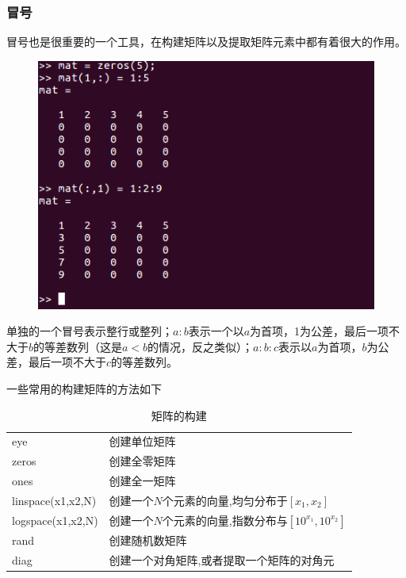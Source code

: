 \documentclass[a4paper,11pt]{ctexart}
\begin{document}
\subsubsection{冒号}
冒号也是很重要的一个工具，在构建矩阵以及提取矩阵元素中都有着很大的作用。
\begin{figure}[H]
	\begin{center}
		\includegraphics[width=.6\textwidth]{maohao.png}
	\end{center}
\end{figure}
单独的一个冒号表示整行或整列；$a:b$表示一个以$a$为首项，1为公差，最后一项不大于$b$的等差数列（这是$a<b$的情况，反之类似）；$a:b:c$表示以$a$为首项，$b$为公差，最后一项不大于$c$的等差数列。\par
一些常用的构建矩阵的方法如下
\begin{table}[H]
	\centering
	\begin{tabular}{ll}
		\hline
eye  &创建单位矩阵\\
zeros &创建全零矩阵\\
ones &创建全一矩阵\\
linspace(x1,x2,N)	& 创建一个$N$个元素的向量,均匀分布于$[x_1,x_2]$	\\
logspace(x1,x2,N)	& 创建一个$N$个元素的向量,指数分布与$[10^{x_1},10^{x_2}]$ \\
rand &创建随机数矩阵\\
diag &创建一个对角矩阵,或者提取一个矩阵的对角元\\
		\hline
	\end{tabular}
	\caption{矩阵的构建}
\end{table}
\end{document}
